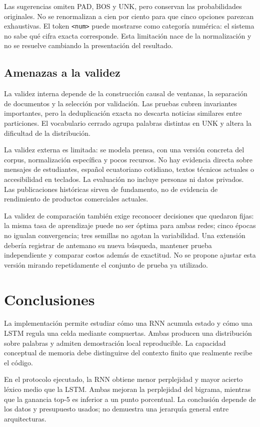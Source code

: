 Las sugerencias omiten PAD, BOS y UNK, pero conservan las probabilidades
originales. No se renormalizan a cien por ciento para que cinco opciones
parezcan exhaustivas. El token \texttt{<num>} puede mostrarse como
categoría numérica: el sistema no sabe qué cifra exacta corresponde.
Esta limitación nace de la normalización y no se resuelve cambiando
la presentación del resultado.

\subsection{Amenazas a la validez}
La validez interna depende de la construcción causal de ventanas,
la separación de documentos y la selección por validación. Las pruebas
cubren invariantes importantes, pero la deduplicación exacta no descarta
noticias similares entre particiones. El vocabulario cerrado agrupa
palabras distintas en UNK y altera la dificultad de la distribución.

La validez externa es limitada: se modela prensa, con una versión
concreta del corpus, normalización específica y pocos recursos.
No hay evidencia directa sobre mensajes de estudiantes, español
ecuatoriano cotidiano, textos técnicos actuales o accesibilidad en
teclados. La evaluación no incluye personas ni datos privados.
Las publicaciones históricas sirven de fundamento, no de evidencia
de rendimiento de productos comerciales actuales.

La validez de comparación también exige reconocer decisiones que
quedaron fijas: la misma tasa de aprendizaje puede no ser óptima
para ambas redes; cinco épocas no igualan convergencia; tres semillas
no agotan la variabilidad. Una extensión debería registrar de antemano
su nueva búsqueda, mantener prueba independiente y comparar costos
además de exactitud. No se propone ajustar esta versión mirando
repetidamente el conjunto de prueba ya utilizado.

\section{Conclusiones}
La implementación permite estudiar cómo una RNN acumula estado y
cómo una LSTM regula una celda mediante compuertas. Ambas producen
una distribución sobre palabras y admiten demostración local reproducible.
La capacidad conceptual de memoria debe distinguirse del contexto
finito que realmente recibe el código.

En el protocolo ejecutado, la RNN obtiene menor perplejidad y mayor
acierto léxico medio que la LSTM. Ambas mejoran la perplejidad del
bigrama, mientras que la ganancia top-5 es inferior a un punto
porcentual. La conclusión depende de los datos y presupuesto usados;
no demuestra una jerarquía general entre arquitecturas.

